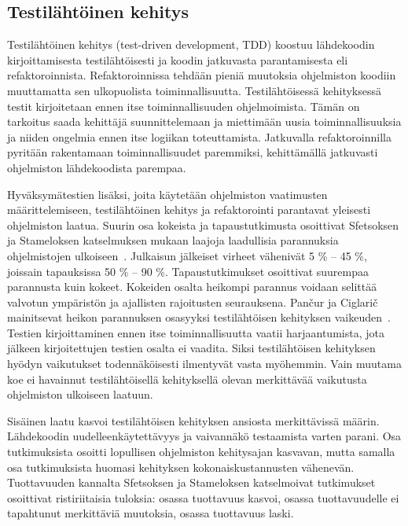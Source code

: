 \documentclass[finnish]{../tktltiki2}
\theoremstyle{definition}
\theoremstyle{remark}
\begin{document}
\subsection{Testilähtöinen kehitys}

Testilähtöinen kehitys (test-driven development, TDD) koostuu lähdekoodin kirjoittamisesta testilähtöisesti ja koodin 
jatkuvasta parantamisesta eli refaktoroinnista. Refaktoroinnissa tehdään pieniä muutoksia ohjelmiston koodiin 
muuttamatta sen ulkopuolista toiminnallisuutta. Testilähtöisessä kehityksessä testit kirjoitetaan ennen itse 
toiminnallisuuden ohjelmoimista. Tämän on tarkoitus saada kehittäjä suunnittelemaan ja miettimään uusia 
toiminnallisuuksia ja niiden ongelmia ennen itse logiikan toteuttamista. Jatkuvalla refaktoroinnilla pyritään 
rakentamaan toiminnallisuudet paremmiksi, kehittämällä jatkuvasti ohjelmiston lähdekoodista parempaa.

    Hyväksymätestien lisäksi, joita käytetään ohjelmiston vaatimusten määrit\-telemiseen, testilähtöinen kehitys ja 
refaktorointi parantavat yleisesti ohjelmiston laatua. Suurin osa kokeista ja tapaustutkimusta osoittivat Sfetsoksen ja 
Stameloksen katselmuksen mukaan laajoja laadullisia parannuksia ohjelmistojen ulkoiseen~\cite{SS10}. Julkaisun 
jälkeiset virheet vähenivät 5 \% -- 45 \%, joissain tapauksissa 50 \% -- 90 \%. Tapaustutkimukset osoittivat suurempaa 
parannusta kuin kokeet. Kokeiden osalta heikompi parannus voidaan selittää valvotun ympäristön ja ajallisten rajoitusten 
seurauksena. Pančur ja Ciglarič mainitsevat heikon parannuksen osasyyksi testilähtöisen kehityksen 
vaikeuden~\cite{PC11}. Testien kirjoittaminen ennen itse toiminnallisuutta vaatii harjaantumista, jota jälkeen 
kirjoitettujen testien osalta ei vaadita. Siksi testilähtöisen kehityksen hyödyn vaikutukset todennäköisesti ilmentyvät 
vasta myöhemmin. Vain muutama koe ei havainnut testilähtöisellä kehityksellä olevan merkittävää vaikutusta ohjelmiston 
ulkoiseen laatuun.

    Sisäinen laatu kasvoi testilähtöisen kehityksen ansiosta merkittävissä määrin. Lähdekoodin uudelleenkäytettävyys ja 
vaivannäkö testaamista varten parani. Osa tutkimuksista osoitti lopullisen ohjelmiston kehitysajan kasvavan, mutta 
samalla osa tutkimuksista huomasi kehityksen kokonaiskustannusten vähenevän. Tuottavuuden kannalta Sfetsoksen ja 
Stameloksen katselmoivat tutkimukset osoittivat ristiriitaisia tuloksia: osassa tuottavuus kasvoi, osassa tuottavuudelle 
ei tapahtunut merkittäviä muutoksia, osassa tuottavuus laski.
\end{document}
